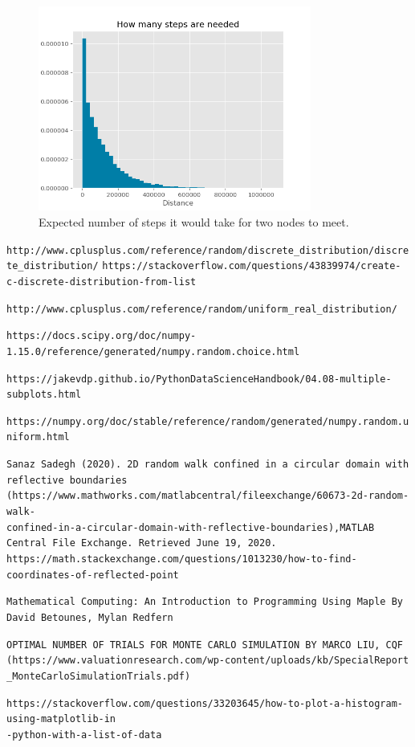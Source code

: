 \documentclass[a4paper, 11pt]{book} %
\begin{document}
\begin{figure}[h]
	\centering
	\includegraphics[width=0.8\textwidth]{Task8.png}
	\caption{Expected number of steps it would take for two nodes to meet.}
	\label{fig:task7}
\end{figure}


\newpage
{}
\begin{thebibliography}{9}
	\texttt{http://www.cplusplus.com/reference/random/discrete\_distribution/discrete\_distribution/}
	\texttt{https://stackoverflow.com/questions/43839974/create-c-discrete-distribution-from-list}
	
    \texttt{http://www.cplusplus.com/reference/random/uniform\_real\_distribution/}
	
    \texttt{https://docs.scipy.org/doc/numpy-1.15.0/reference/generated/numpy.random.choice.html}
	

	\texttt{https://jakevdp.github.io/PythonDataScienceHandbook/04.08-multiple-subplots.html}
	
	\texttt{https://numpy.org/doc/stable/reference/random/generated/numpy.random.uniform.html}
	
	\texttt{Sanaz Sadegh (2020). 2D random walk confined in a circular domain with reflective boundaries (https://www.mathworks.com/matlabcentral/fileexchange/60673-2d-random-walk- \\ confined-in-a-circular-domain-with-reflective-boundaries),MATLAB Central File Exchange. Retrieved June 19, 2020.}
    \texttt{https://math.stackexchange.com/questions/1013230/how-to-find-coordinates-of-reflected-point}
	
	\texttt{Mathematical Computing: An Introduction to Programming Using Maple By David Betounes, Mylan Redfern}
	

	\texttt{OPTIMAL NUMBER OF TRIALS FOR MONTE CARLO SIMULATION BY MARCO LIU, CQF (https://www.valuationresearch.com/wp-content/uploads/kb/SpecialReport\\\_MonteCarloSimulationTrials.pdf) }
	
	\texttt{https://stackoverflow.com/questions/33203645/how-to-plot-a-histogram-using-matplotlib-in\\-python-with-a-list-of-data}


	
\end{thebibliography}
  
\end{document}
